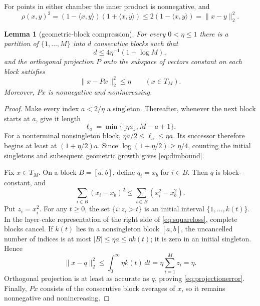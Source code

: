 \documentclass[11pt]{article}
\newtheorem{lemma}{Lemma}
\begin{document}
For points in either chamber the inner product is nonnegative, and
\begin{equation}\label{eq:metriccomparison}
 \rho(x,y)^2=(1-\langle x,y\rangle)(1+\langle x,y\rangle)
 \leq 2(1-\langle x,y\rangle)=\|x-y\|_2^2.
\end{equation}

\begin{lemma}[geometric-block compression]\label{lem:compression}
For every $0<\eta\leq1$ there is a partition of
$\{1,\ldots,M\}$ into $d$ consecutive blocks such that
\begin{equation}\label{eq:dimbound}
 d\leq4\eta^{-1}(1+\log M),
\end{equation}
and the orthogonal projection $P$ onto the subspace of vectors constant on
each block satisfies
\begin{equation}\label{eq:projectionerror}
 \|x-Px\|_2^2\leq\eta\qquad(x\in T_M).
\end{equation}
Moreover, $Px$ is nonnegative and nonincreasing.
\end{lemma}

\begin{proof}
Make every index $a<2/\eta$ a singleton.  Thereafter, whenever the next block
starts at $a$, give it length
\[
 \ell_a=\min\{\lfloor\eta a\rfloor,M-a+1\}.
\]
For a nonterminal nonsingleton block,
$\eta a/2\leq\ell_a\leq\eta a$.  Its successor therefore begins at least at
$(1+\eta/2)a$.  Since
$\log(1+\eta/2)\geq\eta/4$, counting the initial singletons and subsequent
geometric growth gives \eqref{eq:dimbound}.

Fix $x\in T_M$.  On a block $B=[a,b]$, define $q_i=x_b$ for $i\in B$.
Then $q$ is block-constant, and
\begin{equation}\label{eq:squareloss}
 \sum_{i\in B}(x_i-x_b)^2
 \leq\sum_{i\in B}(x_i^2-x_b^2).
\end{equation}
Put $z_i=x_i^2$.  For any $t\geq0$, the set
$\{i:z_i>t\}$ is an initial interval $\{1,\ldots,k(t)\}$.  In the layer-cake
representation of the right side of \eqref{eq:squareloss}, complete blocks
cancel.  If $k(t)$ lies in a nonsingleton block $[a,b]$, the uncancelled number
of indices is at most $|B|\leq\eta a\leq\eta k(t)$; it is zero in an initial
singleton.  Hence
\[
 \|x-q\|_2^2
 \leq \int_0^\infty \eta k(t)\,dt
 =\eta\sum_{i=1}^M z_i=\eta.
\]
Orthogonal projection is at least as accurate as $q$, proving
\eqref{eq:projectionerror}.  Finally, $Px$ consists of the consecutive block
averages of $x$, so it remains nonnegative and nonincreasing.
\end{proof}
\end{document}
